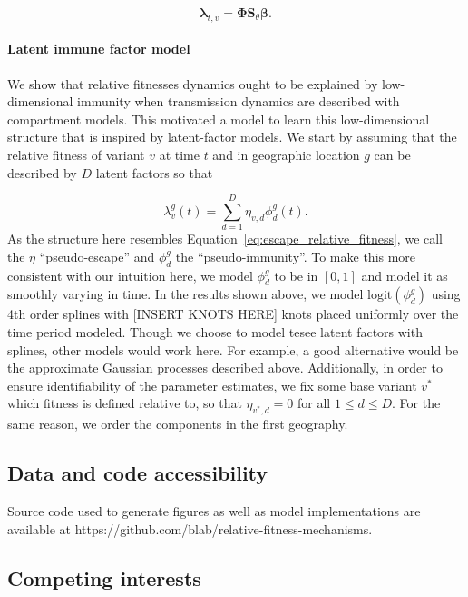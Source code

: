 \documentclass[12pt,oneside,letterpaper]{article}
\renewcommand{\vec}[1]{\boldsymbol{#1}}
\begin{document}
\begin{equation*}
    \vec{\lambda}_{t,v} = \vec{\Phi}\vec{S}_{\theta}\vec{\beta}.
\end{equation*}


\paragraph{Latent immune factor model}%

We show that relative fitnesses dynamics ought to be explained by low-dimensional immunity when transmission dynamics are described with compartment models.
This motivated a model to learn this low-dimensional structure that is inspired by latent-factor models. We start by assuming that the relative fitness of variant $v$ at time $t$ and in geographic location $g$ can be described by $D$ latent factors so that

\begin{equation}
    \lambda_{v}^{g}(t) = \sum_{d=1}^{D} \eta_{v,d} \phi_{d}^{g}(t).
\end{equation}
As the structure here resembles Equation~\ref{eq:escape_relative_fitness}, we call the $\eta$ ``pseudo-escape'' and $\phi_{d}^{g}$ the ``pseudo-immunity''.
To make this more consistent with our intuition here, we model $\phi_{d}^{g}$ to be in $[0,1]$ and model it as smoothly varying in time.
In the results shown above, we model $\text{logit}(\phi_{d}^{g})$ using 4th order splines with [INSERT KNOTS HERE] knots placed uniformly over the time period modeled.
Though we choose to model tesee latent factors with splines, other models would work here. For example, a good alternative would be the approximate Gaussian processes described above.
Additionally, in order to ensure identifiability of the parameter estimates, we fix some base variant $v^*$ which fitness is defined relative to, so that $\eta_{v^*, d} = 0$ for all $1\leq d\leq D$.
For the same reason, we order the components in the first geography.

\subsection*{Data and code accessibility}

Source code used to generate figures as well as model implementations are available at https://github.com/blab/relative-fitness-mechanisms.

\subsection*{Competing interests}%
\end{document}
